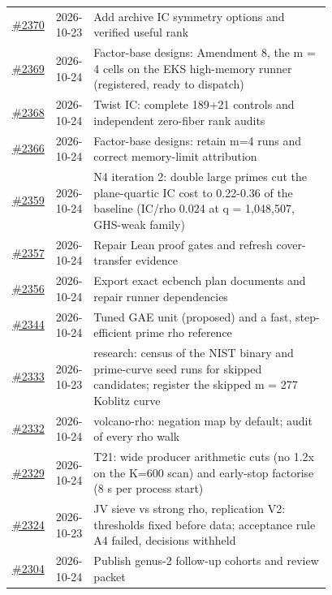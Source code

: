 {\begin{longtable}{@{}r l >{\raggedright\arraybackslash}p{0.78\linewidth}@{}}
\href{https://github.com/aburan28/crypto/pull/2370}{\#2370} & 2026-10-23 & Add archive IC symmetry options and verified useful rank\\
\href{https://github.com/aburan28/crypto/pull/2369}{\#2369} & 2026-10-24 & Factor-base designs: Amendment 8, the m = 4 cells on the EKS high-memory runner (registered, ready to dispatch)\\
\href{https://github.com/aburan28/crypto/pull/2368}{\#2368} & 2026-10-24 & Twist IC: complete 189+21 controls and independent zero-fiber rank audits\\
\href{https://github.com/aburan28/crypto/pull/2366}{\#2366} & 2026-10-24 & Factor-base designs: retain m=4 runs and correct memory-limit attribution\\
\href{https://github.com/aburan28/crypto/pull/2359}{\#2359} & 2026-10-24 & N4 iteration 2: double large primes cut the plane-quartic IC cost to 0.22-0.36 of the baseline (IC/\allowbreak{}rho 0.024 at q = 1,048,507, GHS-weak family)\\
\href{https://github.com/aburan28/crypto/pull/2357}{\#2357} & 2026-10-24 & Repair Lean proof gates and refresh cover-transfer evidence\\
\href{https://github.com/aburan28/crypto/pull/2356}{\#2356} & 2026-10-24 & Export exact ecbench plan documents and repair runner dependencies\\
\href{https://github.com/aburan28/crypto/pull/2344}{\#2344} & 2026-10-24 & Tuned GAE unit (proposed) and a fast, step-efficient prime rho reference\\
\href{https://github.com/aburan28/crypto/pull/2333}{\#2333} & 2026-10-23 & research: census of the NIST binary and prime-curve seed runs for skipped candidates; register the skipped m = 277 Koblitz curve\\
\href{https://github.com/aburan28/crypto/pull/2332}{\#2332} & 2026-10-24 & volcano-rho: negation map by default; audit of every rho walk\\
\href{https://github.com/aburan28/crypto/pull/2329}{\#2329} & 2026-10-24 & T21: wide producer arithmetic cuts (no 1.2x on the K=600 scan) and early-stop factorise (8 s per process start)\\
\href{https://github.com/aburan28/crypto/pull/2324}{\#2324} & 2026-10-23 & JV sieve vs strong rho, replication V2: thresholds fixed before data; acceptance rule A4 failed, decisions withheld\\
\href{https://github.com/aburan28/crypto/pull/2304}{\#2304} & 2026-10-24 & Publish genus-2 follow-up cohorts and review packet\\

\end{longtable}}
